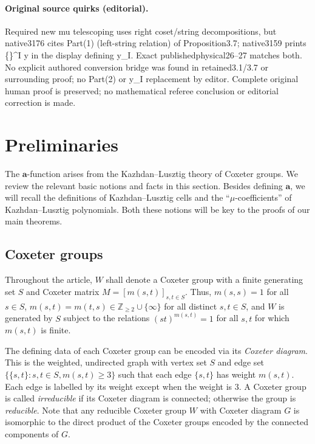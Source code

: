 \documentclass[10pt]{article}
\theoremstyle{definition}
\newcommand{\Z}{\mathbb{Z}}
\newcommand{\la}{\mathbf{a}}
\begin{document}
\paragraph{Original source quirks (editorial).} Required new mu telescoping uses right coset/string decompositions, but native3176 cites Part(1) (left-string relation) of Proposition3.7; native3159 prints \{\}\textasciicircum{}I y in the display defining y\_I. Exact publishedphysical26–27 matches both. No explicit authored conversion bridge was found in retained3.1/3.7 or surrounding proof; no Part(2) or y\_I replacement by editor. Complete original human proof is preserved; no mathematical referee conclusion or editorial correction is made.
\clearpage
\setcounter{section}{1}\setcounter{figure}{1}
\section{Preliminaries}\label{Sect2}
The $\la$-function arises from the Kazhdan--Lusztig theory of Coxeter groups. We
review the relevant basic notions and facts in this section. Besides defining $\la$, we will recall the definitions of Kazhdan--Lusztig cells and the
``$\mu$-coefficients'' of Kazhdan--Lusztig polynomials. Both these notions will be key
to the proofs of our main theorems.

\subsection{Coxeter groups} 
\label{Coxeter def}
Throughout the article, $W$ shall denote a Coxeter
group with a finite generating set $S$ and Coxeter matrix $M=[m(s,t)]_{s,t\in S}$. Thus,
$m(s,s)=1$ for all $s\in S$, $m(s,t)=m(t,s)\in \Z_{\ge 2}\cup \{\infty\}$ for all
distinct $s,t\in S$, and $W$ is generated by $S$ subject to the relations
$(st)^{m(s,t)}=1$ for all $s,t$ for which $m(s,t)$ is finite. 
%
%
%
%


The defining data of each Coxeter group can be encoded via its \emph{Coxeter diagram}.
This is the weighted, undirected graph with vertex set $S$ and edge set
$\{\{s,t\}:s,t\in S,m(s,t)\ge 3\}$ such that each edge $\{s,t\}$ has weight
$m(s,t)$. Each edge is labelled by its weight except when the weight is $3$. 
A Coxeter group is called \emph{irreducible} if its Coxeter diagram is
connected; otherwise the group is \emph{reducible}. Note that any reducible
Coxeter group $W$ with Coxeter diagram $G$ is isomorphic to the direct product
of the Coxeter groups encoded by the connected components of $G$. 
\end{document}
